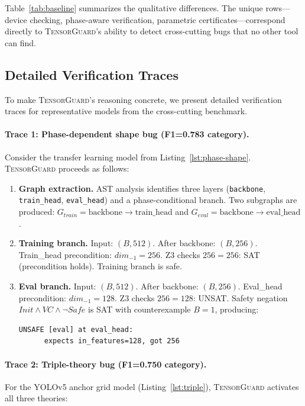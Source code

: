 \documentclass[10pt]{article}
\newcommand{\tguard}{\textsc{TensorGuard}}
\theoremstyle{plain}
\theoremstyle{definition}
\theoremstyle{remark}
\begin{document}
Table~\ref{tab:baseline} summarizes the qualitative differences.
The unique rows---device checking, phase-aware verification,
parametric certificates---correspond directly to \tguard{}'s ability
to detect cross-cutting bugs that no other tool can find.

\subsection{Detailed Verification Traces}

To make \tguard{}'s reasoning concrete, we present detailed verification
traces for representative models from the cross-cutting benchmark.

\paragraph{Trace 1: Phase-dependent shape bug (F1=0.783 category).}
Consider the transfer learning model from Listing~\ref{lst:phase-shape}.
\tguard{} proceeds as follows:

\begin{enumerate}[nosep]
  \item \textbf{Graph extraction.}  AST analysis identifies three layers
    (\texttt{backbone}, \texttt{train\_head}, \texttt{eval\_head}) and
    a phase-conditional branch.  Two subgraphs are produced:
    $G_{\mathit{train}} = \text{backbone} \to \text{train\_head}$ and
    $G_{\mathit{eval}} = \text{backbone} \to \text{eval\_head}$.

  \item \textbf{Training branch.}  Input: $(B, 512)$.  After backbone:
    $(B, 256)$.  Train\_head precondition: $\mathit{dim}_{-1} = 256$.
    Z3 checks $256 = 256$: SAT (precondition holds).  Training branch
    is safe.

  \item \textbf{Eval branch.}  Input: $(B, 512)$.  After backbone:
    $(B, 256)$.  Eval\_head precondition: $\mathit{dim}_{-1} = 128$.
    Z3 checks $256 = 128$: UNSAT.  Safety negation
    $\mathit{Init} \land \mathit{VC} \land \neg\mathit{Safe}$ is SAT
    with counterexample $B = 1$, producing:
    \begin{lstlisting}[style=noline]
    UNSAFE [eval] at eval_head:
      expects in_features=128, got 256
    \end{lstlisting}
\end{enumerate}

\paragraph{Trace 2: Triple-theory bug (F1=0.750 category).}
For the YOLOv5 anchor grid model (Listing~\ref{lst:triple}),
\tguard{} activates all three theories:
\end{document}
